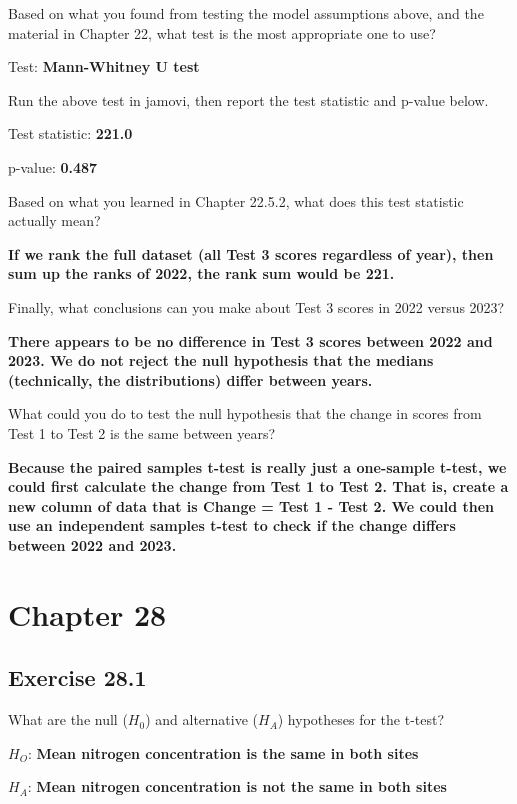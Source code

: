 \documentclass[
  openany]{scrbook}
\begin{document}
Based on what you found from testing the model assumptions above, and the material in Chapter 22, what test is the most appropriate one to use?

Test: \textbf{Mann-Whitney U test}

Run the above test in jamovi, then report the test statistic and p-value below.

Test statistic: \textbf{221.0}

p-value: \textbf{0.487}

Based on what you learned in Chapter 22.5.2, what does this test statistic actually mean?

\textbf{If we rank the full dataset (all Test 3 scores regardless of year), then sum up the ranks of 2022, the rank sum would be 221.}

Finally, what conclusions can you make about Test 3 scores in 2022 versus 2023?

\textbf{There appears to be no difference in Test 3 scores between 2022 and 2023. We do not reject the null hypothesis that the medians (technically, the distributions) differ between years.}

What could you do to test the null hypothesis that the change in scores from Test 1 to Test 2 is the same between years?

\textbf{Because the paired samples t-test is really just a one-sample t-test, we could first calculate the change from Test 1 to Test 2. That is, create a new column of data that is Change = Test 1 - Test 2. We could then use an independent samples t-test to check if the change differs between 2022 and 2023.}

\hypertarget{chapter-28}{%
\section{Chapter 28}\label{chapter-28}}

\hypertarget{exercise-28.1}{%
\subsection{Exercise 28.1}\label{exercise-28.1}}

What are the null (\(H_{0}\)) and alternative (\(H_{A}\)) hypotheses for the t-test?

\(H_{O}\): \textbf{Mean nitrogen concentration is the same in both sites}

\(H_{A}\): \textbf{Mean nitrogen concentration is not the same in both sites}
\end{document}
